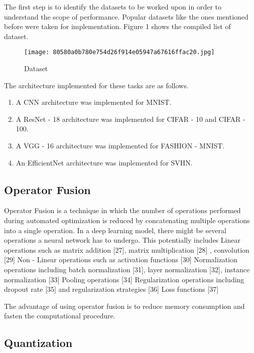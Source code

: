 \documentclass[sigconf]{acmart}
\begin{document}
The first step is to identify the datasets to be worked upon in order to understand the scope of performance. Popular datasets like the ones mentioned before were taken for implementation. Figure 1 shows the compiled list of dataset. 

\begin{figure}[ht]
    \centering
    \texttt{[image: 80580a0b780e754d26f914e05947a67616ffac20.jpg]}
    \caption{Dataset}
    \label{fig:enter-label}
\end{figure}

The architecture implemented for these tasks are as follows.

\begin{enumerate}
    \item A CNN architecture was implemented for MNIST.
    \item A ResNet - 18 architecture was implemented for CIFAR - 10 and CIFAR - 100.
    \item A VGG - 16 architecture was implemented for FASHION - MNIST.
    \item An EfficientNet architecture was implemented for SVHN.
\end{enumerate}

\subsection{Operator Fusion}

Operator Fusion is a technique in which the number of operations performed during automated optimization is reduced by concatenating multiple operations into a single operation. In a deep learning model, there might be several operations a neural network has to undergo. This potentially includes
Linear operations such as matrix addition [27], matrix multiplication [28] , convolution [29]
Non - Linear operations such as activation functions [30]
Normalization operations including batch normalization [31], layer normalization [32], instance normalization [33]
Pooling operations [34]
Regularization operations including dropout rate [35] and regularization strategies [36]
Loss functions [37]

The advantage of using operator fusion is to reduce memory consumption and fasten the computational procedure. 

\subsection{Quantization}
\end{document}
